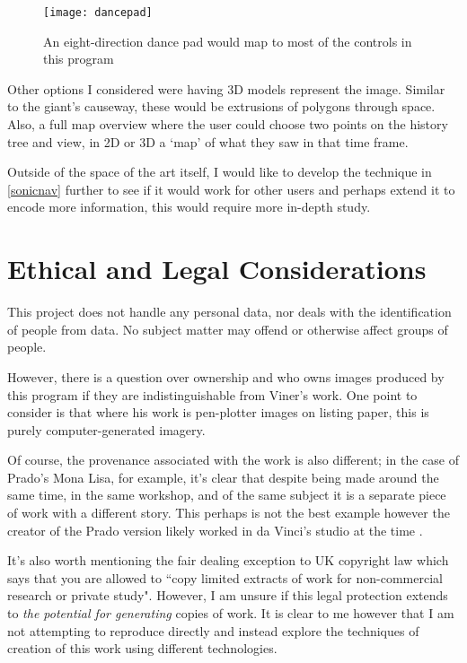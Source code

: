\begin{figure}[H]
    \centering
    \texttt{[image: dancepad]}
    \caption{An eight-direction dance pad would map to most of the controls in
    this program}
\end{figure}

Other options I considered were having 3D models represent the image.  Similar
to the giant's causeway, these would be extrusions of polygons through space.
Also, a full map overview where the user could choose two points on the history
tree and view, in 2D or 3D a `map' of what they saw in that time frame.

Outside of the space of the art itself, I would like to develop the technique in
\autoref{sonicnav} further to see if it would work for other users and perhaps
extend it to encode more information, this would require more in-depth study.

\section{Ethical and Legal Considerations}
This project does not handle any personal data, nor deals with the identification of
people from data. No subject matter may offend or otherwise affect groups of
people. 

However, there is a question over ownership and who owns images produced by this
program if they are indistinguishable from Viner's work.  One point to
consider is that where his work is pen-plotter images on listing paper, this is
purely computer-generated imagery. 

Of course, the provenance associated with the work is also different; in
the case of Prado's Mona Lisa, for example, it's clear that despite being made
around the same time, in the same workshop, and of the same subject it is a
separate piece of work with a different story. This perhaps is not the best
example however the creator of the Prado version likely worked in da Vinci's
studio at the time \citep{museodelprado_MonaLisa}. 

It's also worth mentioning the fair dealing exception to UK copyright law which
says that you are allowed to ``copy limited extracts of work for non-commercial
research or private study"\citep{govuk_copyright}. However, I am unsure if this
legal protection extends to \emph{the potential for generating} copies of work.
It is clear to me however that I am not attempting to reproduce directly and
instead explore the techniques of creation of this work using different
technologies.
